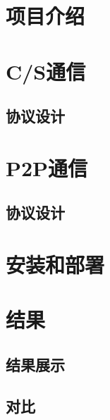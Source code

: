 \documentclass[15pt]{ctexart}
\begin{document}
    
    \tableofcontents
    \newpage
    \section{项目介绍} %
    \label{sec:项目介绍}
    
    \section{C/S通信} %
    \label{sec:c_s通信}
	    \subsection{协议设计} %
	    \label{sub:协议设计}
    	
    	
	
	\section{P2P通信} %
	\label{sec:p2p通信}
		\subsection{协议设计} %
	    \label{sub:协议设计}



	\section{安装和部署} %
	\label{sec:安装和部署}
	
    
    \section{结果} %
    \label{sec:结果}
    	\subsection{结果展示} %
    	\label{sub:结果展示}
    	
    	\subsection{对比} %
    	\label{sub:对比}
    	
\end{document}
